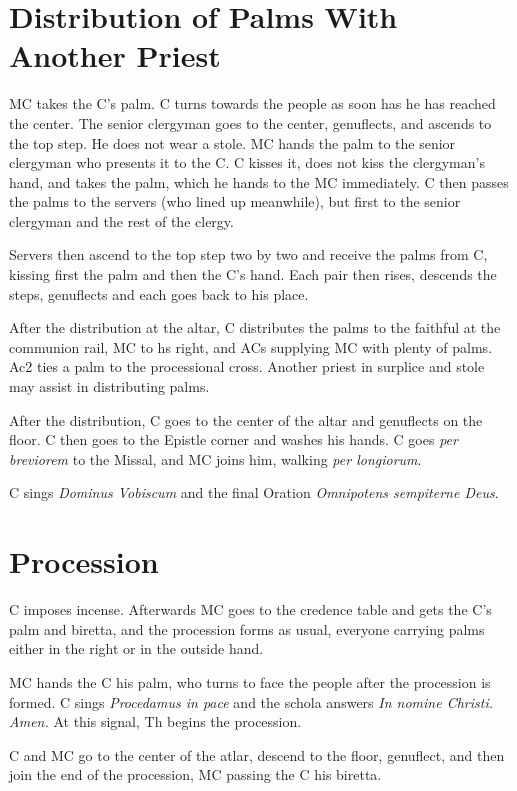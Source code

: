 {	\section{Distribution of Palms With Another Priest}

	\rubric MC takes the C's palm. C turns towards the people as soon has he
	has reached the center. The senior clergyman goes to the center,
	genuflects, and ascends to the top step. He does not wear a stole. MC hands
	the palm to the senior clergyman who presents it to the C. C kisses it,
	does not kiss the clergyman's hand, and takes the palm, which he hands to
	the MC immediately. C then passes the palms to the servers (who lined up
	meanwhile), but first to the senior clergyman and the rest of the clergy.

	\rubric Servers then ascend to the top step two by two and receive the
	palms from C, kissing first the palm and then the C's hand. Each pair then
	rises, descends the steps, genuflects and each goes back to his place.

	\rubric After the distribution at the altar, C distributes the palms to the
	faithful at the communion rail, MC to hs right, and ACs supplying MC with
	plenty of palms. Ac2 ties a palm to the processional cross. Another priest
	in surplice and stole may assist in distributing palms.

	\rubric After the distribution, C goes to the center of the altar and
	genuflects on the floor. C then goes to the Epistle corner and washes his
	hands. C goes \textit{per breviorem} to the Missal, and MC joins him,
	walking \textit{per longiorum}.

	\rubric C sings \textit{Dominus Vobiscum} and the final Oration
	\textit{Omnipotens sempiterne Deus}.

	\section{Procession}

	\rubric C imposes incense. Afterwards MC goes to the credence table and
	gets the C's palm and biretta, and the procession forms as usual, everyone
	carrying palms either in the right or in the outside hand.

	\rubric MC hands the C his palm, who turns to face the people after the
	procession is formed. C sings \textit{Procedamus in pace} and the schola
	answers \textit{In nomine Christi. Amen.} At this signal, Th begins the
	procession.

	\rubric C and MC go to the center of the atlar, descend to the floor,
	genuflect, and then join the end of the procession, MC passing the C his
	biretta.

}
